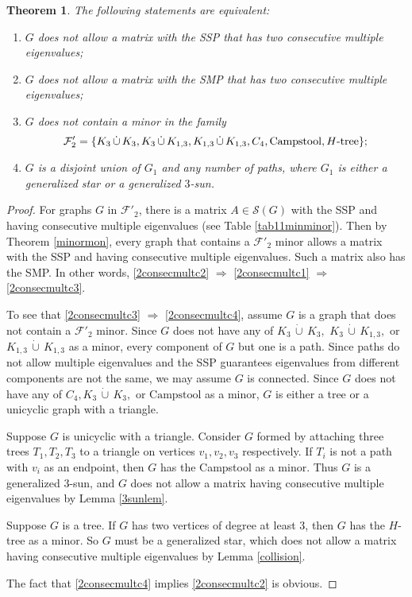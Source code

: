 \documentclass[11pt]{article}
\newtheorem{thm}{Theorem}[section]
\theoremstyle{definition}
\theoremstyle{definition}
\theoremstyle{definition}
\newcommand{\dcup}{\,\dot{\cup}\,}
\newcommand{\ben}{\begin{enumerate}}
\newcommand{\een}{\end{enumerate}}
\newcommand{\mptn}{\mathcal{S}} %
\begin{document}
\begin{thm}\label{thm:twoconmulti}
The following statements are equivalent:
\ben
\item\label{2consecmultc1} $G$ does not allow a matrix with the SSP that has two consecutive multiple eigenvalues;
\item\label{2consecmultc2} $G$ does not allow a matrix with the SMP that has two consecutive multiple eigenvalues;
\item\label{2consecmultc3} $G$ does not contain a minor in the family 
\[\mathcal{F}'_2=\{K_3\dcup K_3, K_3\dcup K_{1,3}, K_{1,3}\dcup K_{1,3}, C_4, {\rm Campstool}, H\mbox{-}{\rm tree}\};\]
\item\label{2consecmultc4} $G$ is a disjoint union of $G_1$ and any number of paths, where $G_1$ is either a generalized star or a generalized $3$-sun.
\een
\end{thm}
\begin{proof}
For graphs $G$ in $\mathcal{F}'_2$, there is a matrix $A\in \mptn(G)$ with the SSP and having consecutive multiple eigenvalues (see Table \ref{tab11minminor}).  Then by Theorem \ref{minormon}, every graph that contains a $\mathcal{F}'_2$ minor allows a matrix with the SSP and having consecutive multiple eigenvalues.  Such a matrix also has the SMP.  In other words, \eqref{2consecmultc2} $\Rightarrow$ \eqref{2consecmultc1} $\Rightarrow$ \eqref{2consecmultc3}.


To see that \eqref{2consecmultc3} $\Rightarrow$ \eqref{2consecmultc4}, assume $G$ is a graph that does not contain a $\mathcal{F}'_2$ minor.  Since $G$ does not have any of $K_3\dcup K_3,$ $ K_3\dcup K_{1,3}, $ or $K_{1,3}\dcup K_{1,3}$ as a minor, every component of $G$ but one is a path.  Since paths do not allow multiple eigenvalues and the SSP guarantees eigenvalues from different components are not the same, we may assume $G$ is connected.  Since $G$ does not have any of $C_4,K_3\dcup K_3,$ or $ \text{Campstool}$ as a minor,   $G$ is either a tree or a unicyclic graph with a triangle.

Suppose $G$ is unicyclic with a triangle.  Consider $G$ formed by attaching three trees $T_1,T_2,T_3$ to a triangle on vertices $v_1,v_2,v_3$ respectively.  If $T_i$ is not a path with $v_i$ as an endpoint, then $G$ has  the Campstool as a minor.  Thus $G$ is a generalized $3$-sun, and $G$ does not allow a matrix having consecutive multiple eigenvalues by Lemma \ref{3sunlem}.

Suppose $G$ is a tree.  If $G$ has two vertices of degree at least 3, then $G$ has the $H$-tree as a minor.  So $G$ must be a generalized star, which does not allow a matrix having consecutive multiple eigenvalues by Lemma \ref{collision}.

The fact that \eqref{2consecmultc4} implies  \eqref{2consecmultc2} is obvious.
\end{proof}
\end{document}

